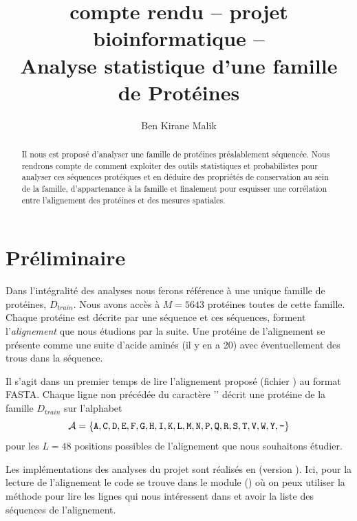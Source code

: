 \documentclass[a4paper, french]{article}
\title{compte rendu -- projet bioinformatique --\\%
Analyse statistique d'une famille de Prot\'eines}
\author{Ben Kirane Malik}
\begin{document}
\maketitle
\setlength{\parskip}{0.1in}
\setlength{\parindent}{15pt}
\begin{abstract}
    Il nous est proposé d'analyser une famille de prot\'eines
    pr\'ealablement s\'equenc\'ee. Nous rendrons compte de comment
    exploiter des outils statistiques et probabilistes pour
    analyser ces séquences protéiques et en d\'eduire des propri\'et\'es
    de conservation au sein de la famille, d'appartenance \`a la famille
    et finalement pour esquisser une corr\'elation entre
    l'alignement des prot\'eines et des mesures spatiales.
\end{abstract}

\section{Pr\'eliminaire}

Dans l'int\'egralit\'e des analyses nous ferons r\'ef\'erence \`a une
unique famille de prot\'eines, $D_{train}$.
Nous avons acc\`es \`a $M=5643$ prot\'eines toutes de cette famille.
%
Chaque prot\'eine est d\'ecrite par une s\'equence et
ces s\'equences, forment l'\emph{alignement}
que nous \'etudions par la suite.  Une prot\'eine de l'alignement se
pr\'esente comme une suite d'acide amin\'es (il y en a 20)
avec \'eventuellement des trous dans la s\'equence.
%
%

Il s'agit dans un premier temps de lire l'alignement propos\'e
(fichier ) au format FASTA.
Chaque ligne non pr\'ec\'ed\'ee du caract\`ere '\cword{>}'
d\'ecrit une prot\'eine de la famille $D_{train}$ sur l'alphabet
\begin{equation*}
    \mathcal{A}=\{\cword{A},\cword{C},\cword{D},\cword{E},\cword{F},\cword{G},
    \cword{H},\cword{I},\cword{K},\cword{L},\cword{M},\cword{N},\cword{P},
\cword{Q},\cword{R},\cword{S},\cword{T},\cword{V},\cword{W},\cword{Y},\cword{-}\}
\end{equation*}
pour les $L=48$ positions possibles de l'alignement que nous souhaitons \'etudier.

Les impl\'ementations des analyses du projet sont r\'ealis\'es en
 (version ). 
Ici, pour la lecture de l'alignement le code se trouve
dans le module  () o\`u on peux utiliser
la m\'ethode  pour lire les lignes qui nous
int\'eressent dans  et avoir la liste des s\'equences
de l'alignement.
\end{document}
